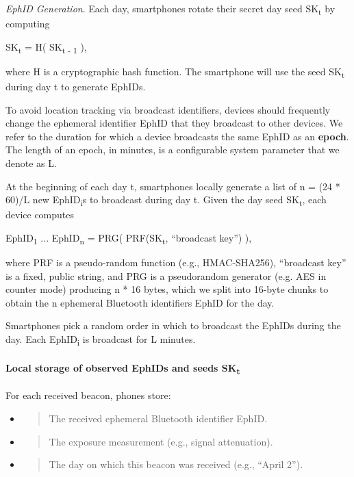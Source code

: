 \documentclass{article}
\begin{document}
\emph{EphID Generation}. Each day, smartphones rotate their secret day
seed SK\textsubscript{t} by computing

SK\textsubscript{t} = H( SK\textsubscript{t - 1} ),

where H is a cryptographic hash function. The smartphone will use the
seed SK\textsubscript{t} during day t to generate EphIDs.

To avoid location tracking via broadcast identifiers, devices should
frequently change the ephemeral identifier EphID that they broadcast to
other devices. We refer to the duration for which a device broadcasts
the same EphID as an \textbf{epoch}. The length of an epoch, in minutes,
is a configurable system parameter that we denote as L.

At the beginning of each day t, smartphones locally generate a list of n
= (24 * 60)/L new EphID\textsubscript{i}s to broadcast during day t.
Given the day seed SK\textsubscript{t}, each device computes

EphID\textsubscript{1} \textbar\textbar{} ... \textbar\textbar{}
EphID\textsubscript{n} = PRG( PRF(SK\textsubscript{t}, ``broadcast
key'') ),

where PRF is a pseudo-random function (e.g., HMAC-SHA256), ``broadcast
key'' is a fixed, public string, and PRG is a pseudorandom generator
(e.g. AES in counter mode) producing n * 16 bytes, which we split into
16-byte chunks to obtain the n ephemeral Bluetooth identifiers EphID for
the day.

Smartphones pick a random order in which to broadcast the EphIDs during
the day. Each EphID\textsubscript{i} is broadcast for L minutes.

\hypertarget{local-storage-of-observed-ephids-and-seeds-skt}{%
\paragraph{\texorpdfstring{Local storage of observed EphIDs and seeds
SK\textsubscript{t}
}{Local storage of observed EphIDs and seeds SKt }}\label{local-storage-of-observed-ephids-and-seeds-skt}}

For each received beacon, phones store:

\begin{itemize}
\item
  \begin{quote}
  The received ephemeral Bluetooth identifier EphID.
  \end{quote}
\item
  \begin{quote}
  The exposure measurement (e.g., signal attenuation).
  \end{quote}
\item
  \begin{quote}
  The day on which this beacon was received (e.g., ``April 2'').
  \end{quote}
\end{itemize}
\end{document}
